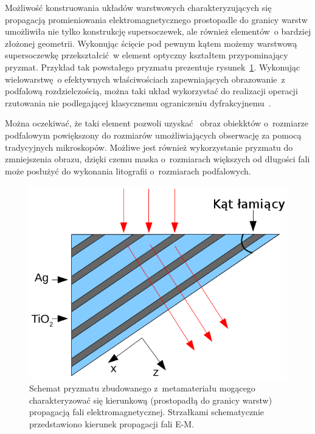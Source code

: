 Możliwość konstruowania układów warstwowych charakteryzujących się propagacją promieniowania elektromagnetycznego prostopadle do granicy warstw umożliwiła nie tylko konstrukcję supersoczewek, ale również elementów~o bardziej złożonej geometrii. Wykonując ścięcie pod pewnym kątem możemy warstwową supersoczewkę przekształcić~w element optyczny kształtem przypominający pryzmat. Przykład tak powstałego pryzmatu prezentuje rysunek~\ref{fig:prism-schema}. Wykonując wielowarstwę~o efektywnych właściwościach zapewniających obrazowanie~z podfalową rozdzielczością, można taki układ wykorzystać do realizacji operacji rzutowania nie podlegającej klasycznemu ograniczeniu dyfrakcyjnemu~\cite{prism2010}. 

Można oczekiwać, że taki element pozwoli uzyskać~ obraz obiekktów o~rozmiarze podfalowym powiększony do rozmiarów umożliwiających obserwację za pomocą tradycyjnych mikroskopów. Możliwe jest również wykorzystanie pryzmatu do zmniejszenia obrazu, dzięki czemu maska o~rozmiarach większych od długości fali może posłużyć do wykonania litografii o~rozmiarach podfalowych.

			\begin{figure}[tbH]
				\includegraphics[width=\textwidth]{images/multilayer/prism.png}
				\caption{Schemat pryzmatu zbudowanego z~metamateriału mogącego charakteryzować się kierunkową (prostopadłą do granicy warstw) propagacją fali elektromagnetycznej. Strzałkami schematycznie przedstawiono kierunek propagacji fali E-M.}
				\label{fig:prism-schema}
			\end{figure}


